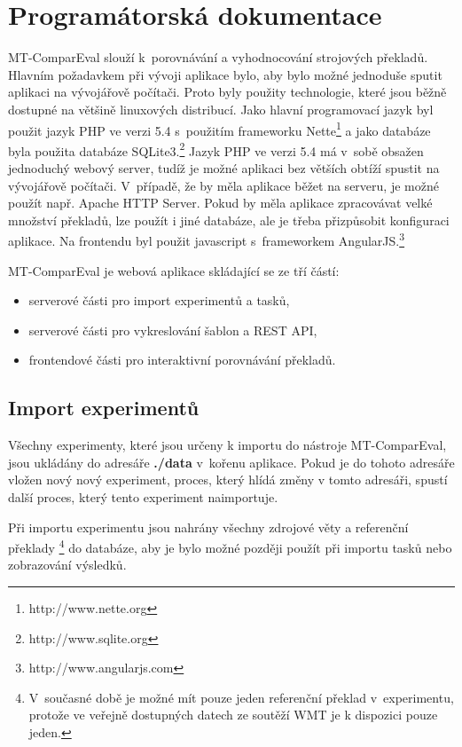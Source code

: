 \chapter{Programátorská dokumentace}
\label{chap:programmers}


\mbox{MT-ComparEval} slouží k~porovnávání a vyhodnocování strojových překladů.
Hlavním požadavkem při vývoji aplikace bylo,
  aby bylo možné jednoduše sputit aplikaci na vývojářově počítači.
Proto byly použity technologie,
  které jsou běžně dostupné na většině linuxových distribucí.
Jako hlavní programovací jazyk byl použit jazyk PHP ve verzi 5.4 
  s~použitím frameworku Nette\footnote{http://www.nette.org}
  a jako databáze byla použita databáze SQLite3.\footnote{http://www.sqlite.org}
Jazyk PHP ve verzi 5.4 má v~sobě obsažen jednoduchý webový server,
  tudíž je možné aplikaci bez větších obtíží spustit na vývojářově počítači.
V~případě, že by měla aplikace běžet na serveru,
  je možné použít např. Apache HTTP Server.
Pokud by měla aplikace zpracovávat velké množství překladů,
  lze použít i jiné databáze,
  ale je třeba přizpůsobit konfiguraci aplikace.
Na frontendu byl použit javascript s~frameworkem AngularJS.\footnote{http://www.angularjs.com}

\mbox{MT-ComparEval} je webová aplikace skládající se ze tří částí:
\begin{itemize}
	\item serverové části pro import experimentů a tasků,
	\item serverové části pro vykreslování šablon a REST API,
	\item frontendové části pro interaktivní porovnávání překladů.
\end{itemize}

\section{Import experimentů}
Všechny experimenty, které jsou určeny k importu do nástroje \mbox{MT-ComparEval},
  jsou ukládány do adresáře \textbf{./data} v~kořenu aplikace.
Pokud je do tohoto adresáře vložen nový nový experiment,
  proces, který hlídá změny v tomto adresáři,
  spustí další proces, který tento experiment naimportuje.

Při importu experimentu jsou nahrány všechny zdrojové věty
  a referenční překlady \footnote{
	V~současné době je možné mít pouze jeden referenční překlad v~experimentu,
	protože ve veřejně dostupných datech ze soutěží WMT je k dispozici pouze jeden. }
  do databáze,
  aby je bylo možné později použít při importu tasků
  nebo zobrazování výsledků.

